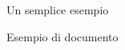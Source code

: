 \begin{frame}[fragile]{Un semplice esempio}

\begin{esempio}{Esempio di documento}
\end{esempio}

\end{frame}